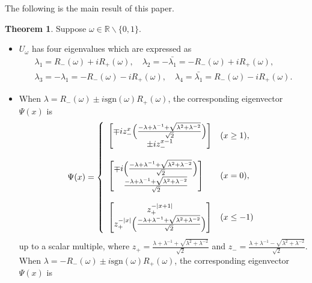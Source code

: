 \documentclass[a4paper,12pt]{article}
\theoremstyle{plain}
\theoremstyle{definition}
\newtheorem{thm}{Theorem}[section]
\theoremstyle{definition}
\begin{document}
The following is the main result of this paper.

\begin{thm} \label{thm31}
Suppose $\omega \in \mathbb{R}\backslash \{0,1\}$. 
\begin{itemize}
\item[(i)] $U_\omega$ has four eigenvalues which are expressed as
\begin{align}
\lambda_{1}=R_{-}(\omega)+iR_{+}(\omega),\quad
  \lambda_{2}=-\bar{\lambda_{1}}=-R_{-}(\omega)+iR_{+}(\omega),\nonumber \\
  \lambda_{3}=-\lambda_{1}=-R_{-}(\omega)-iR_{+}(\omega),\quad \lambda_{4}=\bar{\lambda_{1}}=R_{-}(\omega)-iR_{+}(\omega) . \nonumber
\end{align}
\item[(ii)]
When $\lambda = R_-(\omega) \pm i \mathrm{sgn}(\omega)R_+(\omega)$, the corresponding eigenvector $\Psi (x)$ is
\begin{eqnarray}
\Psi(x)=
\left\{\begin{array}{ll}
\begin{bmatrix}
\mp i z_{-}^{x}\Bigl(\frac{-\lambda +\lambda^{-1}+\sqrt{\lambda^2+\lambda^{-2}}}{\sqrt{2}} \Bigr) \\
\pm i z_{-}^{x-1}
\end{bmatrix} & (x\geq 1 ), \\\\
\begin{bmatrix}
    \mp i\Bigl(\frac{-\lambda +\lambda^{-1}+\sqrt{\lambda^2+\lambda^{-2}}}{\sqrt{2}} \Bigr) \\
    \frac{-\lambda +\lambda^{-1}+\sqrt{\lambda^2+\lambda^{-2}}}{\sqrt{2}}
\end{bmatrix} & (x=0), \\\\
\begin{bmatrix}
z_{+}^{-|x+1|} \\
z_{+}^{-|x|}\Bigl(\frac{-\lambda +\lambda^{-1}+\sqrt{\lambda^2+\lambda^{-2}}}{\sqrt{2}} \Bigr)
\end{bmatrix} & (x\leq -1)
\end{array}\right. \nonumber
\end{eqnarray}
up to a scalar multiple, where $z_{+} = \frac{\lambda +\lambda ^{-1}+\sqrt{\lambda^2 + \lambda^{-2}}}{\sqrt{2}}$ and $z_{-}=\frac{\lambda +\lambda ^{-1}-\sqrt{\lambda^2 + \lambda^{-2}}}{\sqrt{2}}$.
When $\lambda = -R_-(\omega) \pm i \mathrm{sgn}(\omega)R_+(\omega)$, the corresponding eigenvector $\Psi (x)$ is 
\begin{eqnarray}

\end{eqnarray}
\end{itemize}
\end{thm}
\end{document}
